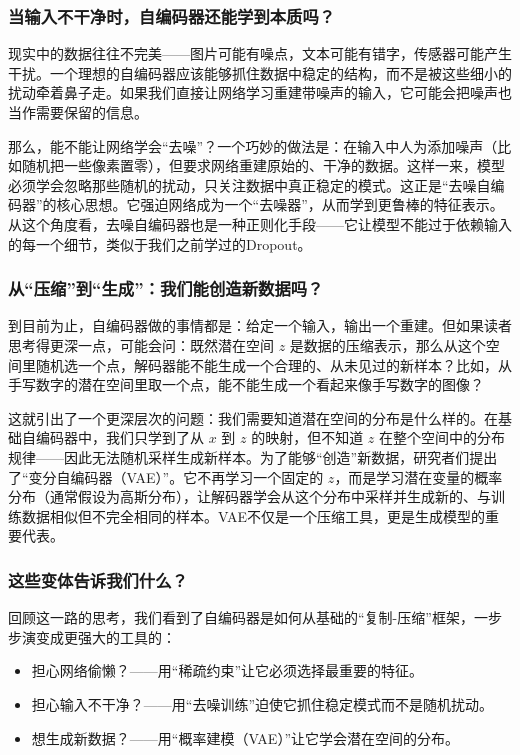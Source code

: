\documentclass[lang=cn,zihao=-4,a4paper,fontset=windows]{beautybook}
\begin{document}
\subsubsection*{当输入不干净时，自编码器还能学到本质吗？}

现实中的数据往往不完美——图片可能有噪点，文本可能有错字，传感器可能产生干扰。一个理想的自编码器应该能够抓住数据中稳定的结构，而不是被这些细小的扰动牵着鼻子走。如果我们直接让网络学习重建带噪声的输入，它可能会把噪声也当作需要保留的信息。

那么，能不能让网络学会“去噪”？一个巧妙的做法是：在输入中人为添加噪声（比如随机把一些像素置零），但要求网络重建原始的、干净的数据。这样一来，模型必须学会忽略那些随机的扰动，只关注数据中真正稳定的模式。这正是“去噪自编码器”的核心思想。它强迫网络成为一个“去噪器”，从而学到更鲁棒的特征表示。从这个角度看，去噪自编码器也是一种正则化手段——它让模型不能过于依赖输入的每一个细节，类似于我们之前学过的Dropout。

\subsubsection*{从“压缩”到“生成”：我们能创造新数据吗？}

到目前为止，自编码器做的事情都是：给定一个输入，输出一个重建。但如果读者思考得更深一点，可能会问：既然潜在空间 \(z\) 是数据的压缩表示，那么从这个空间里随机选一个点，解码器能不能生成一个合理的、从未见过的新样本？比如，从手写数字的潜在空间里取一个点，能不能生成一个看起来像手写数字的图像？

这就引出了一个更深层次的问题：我们需要知道潜在空间的分布是什么样的。在基础自编码器中，我们只学到了从 \(x\) 到 \(z\) 的映射，但不知道 \(z\) 在整个空间中的分布规律——因此无法随机采样生成新样本。为了能够“创造”新数据，研究者们提出了“变分自编码器（VAE）”。它不再学习一个固定的 \(z\)，而是学习潜在变量的概率分布（通常假设为高斯分布），让解码器学会从这个分布中采样并生成新的、与训练数据相似但不完全相同的样本。VAE不仅是一个压缩工具，更是生成模型的重要代表。

\subsubsection*{这些变体告诉我们什么？}

回顾这一路的思考，我们看到了自编码器是如何从基础的“复制-压缩”框架，一步步演变成更强大的工具的：
\begin{itemize}
\item 担心网络偷懒？——用“稀疏约束”让它必须选择最重要的特征。
\item 担心输入不干净？——用“去噪训练”迫使它抓住稳定模式而不是随机扰动。
\item 想生成新数据？——用“概率建模（VAE）”让它学会潜在空间的分布。
\end{itemize}
\end{document}
